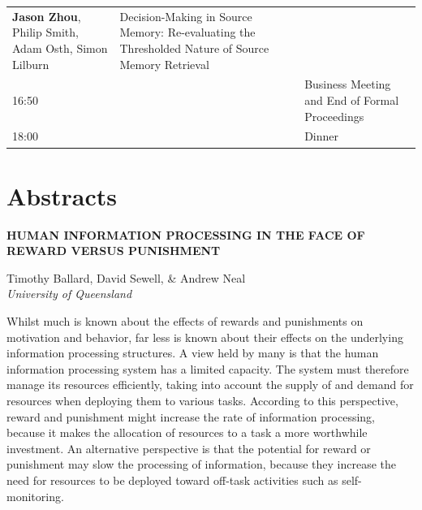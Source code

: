 \documentclass[]{article}
\begin{document}
\begin{longtable}[]{@{}lll@{}}
\begin{minipage}[t]{0.32\columnwidth}
\textbf{Jason Zhou}, Philip Smith, Adam Osth, Simon Lilburn\strut
\end{minipage} & \begin{minipage}[t]{0.57\columnwidth}\raggedright\strut
Decision-Making in Source Memory: Re-evaluating the Thresholded Nature
of Source Memory Retrieval\strut
\end{minipage}\tabularnewline
\begin{minipage}[t]{0.03\columnwidth}\raggedright\strut
16:50\strut
\end{minipage} & \begin{minipage}[t]{0.32\columnwidth}\raggedright\strut
\strut
\end{minipage} & \begin{minipage}[t]{0.57\columnwidth}\raggedright\strut
Business Meeting and End of Formal Proceedings\strut
\end{minipage}\tabularnewline
\begin{minipage}[t]{0.03\columnwidth}\raggedright\strut
18:00\strut
\end{minipage} & \begin{minipage}[t]{0.32\columnwidth}\raggedright\strut
\strut
\end{minipage} & \begin{minipage}[t]{0.57\columnwidth}\raggedright\strut
Dinner\strut
\end{minipage}\tabularnewline
\bottomrule
\end{longtable}

\pagebreak

\section{Abstracts}\label{abstracts}

\textbf{HUMAN INFORMATION PROCESSING IN THE FACE OF REWARD VERSUS
PUNISHMENT}

Timothy Ballard, David Sewell, \& Andrew Neal\\
\emph{University of Queensland}

Whilst much is known about the effects of rewards and punishments on
motivation and behavior, far less is known about their effects on the
underlying information processing structures. A view held by many is
that the human information processing system has a limited capacity. The
system must therefore manage its resources efficiently, taking into
account the supply of and demand for resources when deploying them to
various tasks. According to this perspective, reward and punishment
might increase the rate of information processing, because it makes the
allocation of resources to a task a more worthwhile investment. An
alternative perspective is that the potential for reward or punishment
may slow the processing of information, because they increase the need
for resources to be deployed toward off-task activities such as
self-monitoring.
\end{document}

